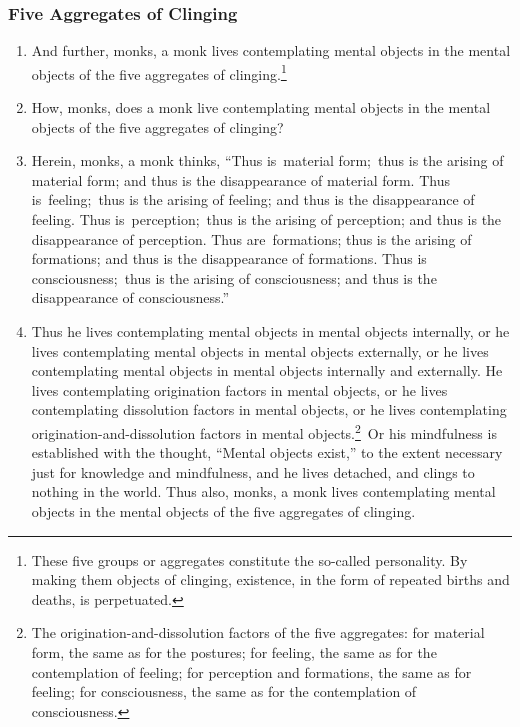 \subsubsection*{Five Aggregates of Clinging}
\begin{enumerate}[resume]
\item And further, monks, a monk lives contemplating mental objects in the mental objects of the five aggregates of clinging.\footnote{These five groups or aggregates constitute the so-called personality. By making them objects of clinging, existence, in the form of repeated births and deaths, is perpetuated.}
\item How, monks, does a monk live contemplating mental objects in the mental objects of the five aggregates of clinging?
\item Herein, monks, a monk thinks, “Thus is material form; thus is the arising of material form; and thus is the disappearance of material form. Thus is feeling; thus is the arising of feeling; and thus is the disappearance of feeling. Thus is perception; thus is the arising of perception; and thus is the disappearance of perception. Thus are formations; thus is the arising of formations; and thus is the disappearance of formations. Thus is consciousness; thus is the arising of consciousness; and thus is the disappearance of consciousness.”
\item Thus he lives contemplating mental objects in mental objects internally, or he lives contemplating mental objects in mental objects externally, or he lives contemplating mental objects in mental objects internally and externally. He lives contemplating origination factors in mental objects, or he lives contemplating dissolution factors in mental objects, or he lives contemplating origination-and-dissolution factors in mental objects.\footnote{The origination-and-dissolution factors of the five aggregates: for material form, the same as for the postures; for feeling, the same as for the contemplation of feeling; for perception and formations, the same as for feeling; for consciousness, the same as for the contemplation of consciousness.} Or his mindfulness is established with the thought, “Mental objects exist,” to the extent necessary just for knowledge and mindfulness, and he lives detached, and clings to nothing in the world. Thus also, monks, a monk lives contemplating mental objects in the mental objects of the five aggregates of clinging.
\end{enumerate}
